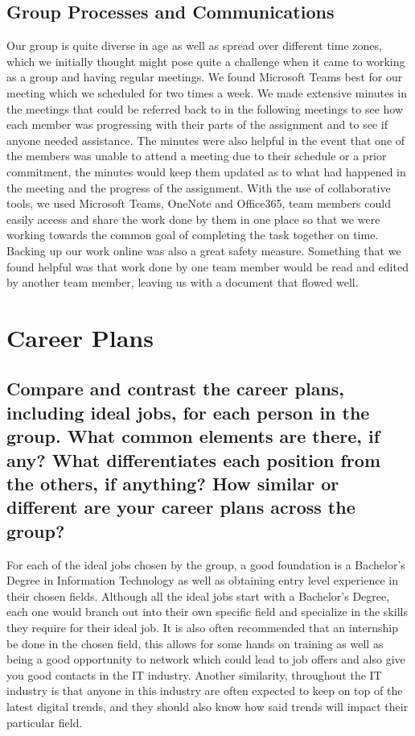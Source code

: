 \documentclass[11pt, oneside, a4paper, titlepage]{article}
\begin{document}
\subsection{Group Processes and Communications }
Our group is quite diverse in age as well as spread over different time zones, which we initially thought might pose quite a challenge when it came to working as a group and having regular meetings. We found Microsoft Teams best for our meeting which we scheduled for two times a week. We made extensive minutes in the meetings that could be referred back to in the following meetings to see how each member was progressing with their parts of the assignment and to see if anyone needed assistance. The minutes were also helpful in the event that one of the members was unable to attend a meeting due to their schedule or a prior commitment, the minutes would keep them updated as to what had happened in the meeting and the progress of the assignment.  With the use of collaborative tools, we used Microsoft Teams, OneNote and Office365, team members could easily access and share the work done by them in one place so that we were working towards the common goal of completing the task together on time. Backing up our work online was also a great safety measure. Something that we found helpful was that work done by one team member would be read and edited by another team member, leaving us with a document that flowed well.  

\section{Career Plans}
\subsection{Compare and contrast the career plans, including ideal jobs, for each person in the group. What common elements are there, if any? What differentiates each position from the others, if anything? How similar or different are your career plans across the group?}
For each of the ideal jobs chosen by the group, a good foundation is a Bachelor’s Degree in Information Technology as well as obtaining entry level experience in their chosen fields. Although all the ideal jobs start with a Bachelor’s Degree, each one would branch out into their own specific field and specialize in the skills they require for their ideal job. It is also often recommended that an internship be done in the chosen field, this allows for some hands on training as well as being a good opportunity to network which could lead to job offers and also give you good contacts in the IT industry. Another similarity, throughout the IT industry is that anyone in this industry are often expected to keep on top of the latest digital trends, and they should also know how said trends will impact their particular field. 
\end{document}
